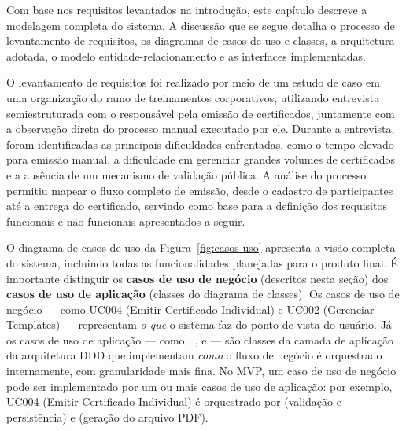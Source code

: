 ﻿

Com base nos requisitos levantados na introdução, este capítulo descreve a modelagem completa do sistema. A discussão que se segue detalha o processo de levantamento de requisitos, os diagramas de casos de uso e classes, a arquitetura adotada, o modelo entidade-relacionamento e as interfaces implementadas.

\label{sec:requisitos}

O levantamento de requisitos foi realizado por meio de um estudo de caso em uma organização do ramo de treinamentos corporativos, utilizando entrevista semiestruturada com o responsável pela emissão de certificados, juntamente com a observação direta do processo manual executado por ele. Durante a entrevista, foram identificadas as principais dificuldades enfrentadas, como o tempo elevado para emissão manual, a dificuldade em gerenciar grandes volumes de certificados e a ausência de um mecanismo de validação pública. A análise do processo permitiu mapear o fluxo completo de emissão, desde o cadastro de participantes até a entrega do certificado, servindo como base para a definição dos requisitos funcionais e não funcionais apresentados a seguir.









O diagrama de casos de uso da Figura~\ref{fig:casos-uso} apresenta a visão completa do sistema, incluindo todas as funcionalidades planejadas para o produto final. É importante distinguir os \textbf{casos de uso de negócio} (descritos nesta seção) dos \textbf{casos de uso de aplicação} (classes do diagrama de classes). Os casos de uso de negócio --- como UC004 (Emitir Certificado Individual) e UC002 (Gerenciar Templates) --- representam \textit{o que} o sistema faz do ponto de vista do usuário. Já os casos de uso de aplicação --- como , ,  e  --- são classes da camada de aplicação da arquitetura DDD que implementam \textit{como} o fluxo de negócio é orquestrado internamente, com granularidade mais fina. No MVP, um caso de uso de negócio pode ser implementado por um ou mais casos de uso de aplicação: por exemplo, UC004 (Emitir Certificado Individual) é orquestrado por  (validação e persistência) e  (geração do arquivo PDF).

